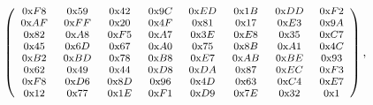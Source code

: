 \documentclass[journal=tosc,final,nohyperref]{iacrtrans}
\begin{document}
\[\footnotesize
\left(
\begin{array}{cccccccc}
\text{0x}F8~& \text{0x}59~& \text{0x}42~& \text{0x}9C~& \text{0x}ED~& \text{0x}1B~& \text{0x}DD~& \text{0x}F2\\
\text{0x}AF~& \text{0x}FF~& \text{0x}20~& \text{0x}4F~& \text{0x}81~& \text{0x}17~& \text{0x}E3~& \text{0x}9A\\
\text{0x}82~& \text{0x}A8~& \text{0x}F5~& \text{0x}A7~& \text{0x}3E~& \text{0x}E8~& \text{0x}35~& \text{0x}C7\\
\text{0x}45~& \text{0x}6D~& \text{0x}67~& \text{0x}A0~& \text{0x}75~& \text{0x}8B~& \text{0x}A1~& \text{0x}4C\\
\text{0x}B2~& \text{0x}BD~& \text{0x}78~& \text{0x}B8~& \text{0x}E7~& \text{0x}AB~& \text{0x}BE~& \text{0x}93\\
\text{0x}62~& \text{0x}49~& \text{0x}44~& \text{0x}D8~& \text{0x}DA~& \text{0x}87~& \text{0x}EC~& \text{0x}F3\\
\text{0x}F8~& \text{0x}D6~& \text{0x}8D~& \text{0x}96~& \text{0x}4D~& \text{0x}63~& \text{0x}C4~& \text{0x}E7\\
\text{0x}12~& \text{0x}77~& \text{0x}1E~& \text{0x}F1~& \text{0x}D9~& \text{0x}7E~& \text{0x}32~& \text{0x}1
\end{array}
\right),
\]
\end{document}
